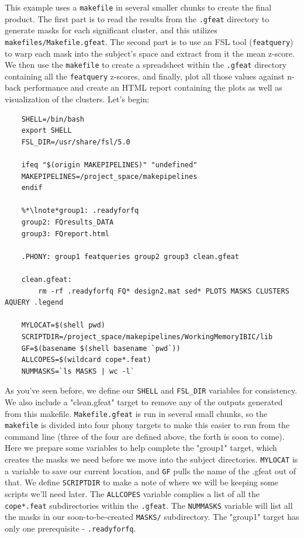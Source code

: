 This example uses a \texttt{makefile} in several smaller chunks to create the final product. The first part is to read the results from the \texttt{.gfeat} directory to generate masks for each significant cluster, and this utilizes \texttt{makefiles/Makefile.gfeat}. The second part is to use an FSL tool (\texttt{featquery}) to warp each mask into the subject's space and extract from it the mean z-score. We then use the \texttt{makefile} to create a spreadsheet within the \texttt{.gfeat} directory containing all the \texttt{featquery} z-scores, and finally, plot all those values against n-back performance and create an HTML report containing the plots as well as visualization of the clusters. Let's begin:
\begin{lstlisting}
	SHELL=/bin/bash
	export SHELL
	FSL_DIR=/usr/share/fsl/5.0
	
	ifeq "$(origin MAKEPIPELINES)" "undefined"
	MAKEPIPELINES=/project_space/makepipelines
	endif
	
	%*\lnote*group1: .readyforfq
	group2: FQresults_DATA
	group3: FQreport.html
	
	.PHONY: group1 featqueries group2 group3 clean.gfeat 
	
	clean.gfeat:
		rm -rf .readyforfq FQ* design2.mat sed* PLOTS MASKS CLUSTERS AQUERY .legend
		
	MYLOCAT=$(shell pwd)
	SCRIPTDIR=/project_space/makepipelines/WorkingMemoryIBIC/lib
	GF=$(basename $(shell basename `pwd`))
	ALLCOPES=$(wildcard cope*.feat)
	NUMMASKS=`ls MASKS | wc -l`
\end{lstlisting}
As you've seen before, we define our \texttt{SHELL} and \texttt{FSL_DIR} variables for consistency. We also include a "clean.gfeat" target to remove any of the outputs generated from this makefile.  \texttt{Makefile.gfeat} is run in several small chunks, so the \texttt{makefile} is divided into four phony targets to make this easier to run from the command line (three of the four are defined above, the forth is soon to come). Here we prepare some variables to help \maken{} complete the "group1" target, which creates the masks we need before we move into the subject directories. \texttt{MYLOCAT} is a variable to save our current location, and \texttt{GF} pulls the name of the .gfeat out of that. We define \texttt{SCRIPTDIR} to make a note of where we will be keeping some scripts we'll need later. The \texttt{ALLCOPES} variable complies a list of all the \texttt{cope*.feat} subdirectories within the \texttt{.gfeat}. The \texttt{NUMMASKS} variable will list all the masks in our soon-to-be-created \texttt{MASKS/} subdirectory. The "group1" target has only one prerequisite - \texttt{.readyforfq}.


